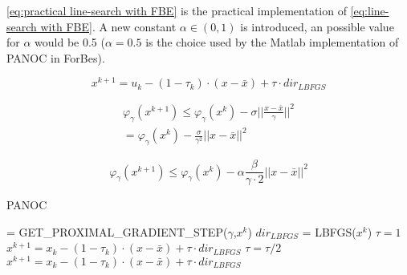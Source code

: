 	 \eqref{eq:practical line-search with FBE} is the practical implementation of \eqref{eq:line-search with FBE}. A new constant $\alpha \in (0,1)$ is introduced, an possible value for $\alpha$ would be 0.5 ($\alpha=0.5$ is the choice used by the Matlab implementation of PANOC in ForBes).
	
	\begin{equation}
		x^{k+1} = u_k - (1-\tau_k)\cdot (x-\bar{x}) + \tau \cdot dir_{LBFGS}
		\label{eq:linea-search tau definition}
	\end{equation}
	
	\begin{eqnarray}
		\label{eq:line-search with FBE}
		\varphi_{\gamma}(x^{k+1})\leq\varphi_{\gamma}(x^{k}) - \sigma ||\frac{x-\bar{x}}{\gamma}||^2 \\
		=
		\varphi_{\gamma}(x^{k}) - \frac{\sigma}{\gamma^2} ||x-\bar{x}||^2
	\end{eqnarray}
	
	\begin{equation}
		\varphi_{\gamma}(x^{k+1}) \leq 		\varphi_{\gamma}(x^{k}) - \alpha \frac{\beta }{\gamma \cdot 2} ||x-\bar{x}||^2
		\label{eq:practical line-search with FBE}
	\end{equation}
	
	
		
		\begin{algorithm}
			\caption{PANOC}
			\label{alg:PANOC}
			\begin{algorithmic}[1]
				 = GET\_PROXIMAL\_GRADIENT\_STEP($\gamma$,$x^k$)
				\State $ dir_{LBFGS}$ = LBFGS($x^k$)
				\State $\tau =1$
				\State $x^{k+1} = x_k - (1-\tau_k)\cdot (x-\bar{x}) + \tau \cdot dir_{LBFGS}$
				\State $\tau = \tau / 2$
				\State $x^{k+1} = x_k - (1-\tau_k)\cdot (x-\bar{x}) + \tau \cdot dir_{LBFGS}$
				\EndWhile
				\EndProcedure
			\end{algorithmic}
		\end{algorithm}
	